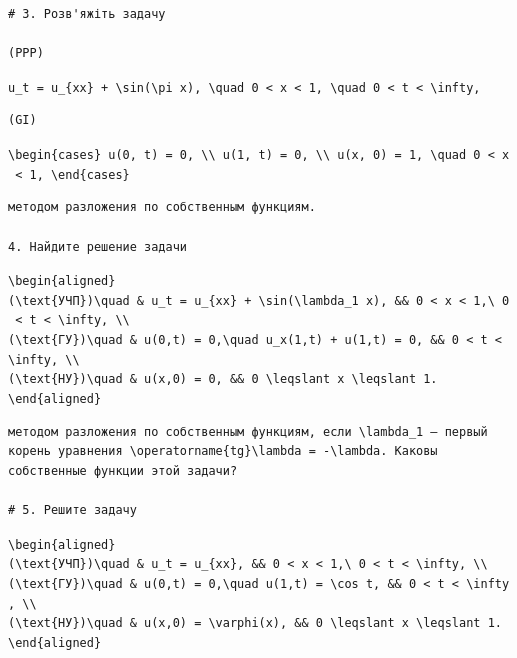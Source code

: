 \documentclass[
  ukrainian,
]{article}
\begin{document}
\begin{verbatim}
# 3. Розв'яжіть задачу

(PPP)
\end{verbatim}

\texttt{u\_t\ =\ u\_\{xx\}\ +\ \textbackslash{}sin(\textbackslash{}pi\ x),\ \textbackslash{}quad\ 0\ \textless{}\ x\ \textless{}\ 1,\ \textbackslash{}quad\ 0\ \textless{}\ t\ \textless{}\ \textbackslash{}infty,}

\begin{verbatim}
(GI)
\end{verbatim}

\texttt{\textbackslash{}begin\{cases\}\ u(0,\ t)\ =\ 0,\ \textbackslash{}\textbackslash{}\ u(1,\ t)\ =\ 0,\ \textbackslash{}\textbackslash{}\ u(x,\ 0)\ =\ 1,\ \textbackslash{}quad\ 0\ \textless{}\ x\ \textless{}\ 1,\ \textbackslash{}end\{cases\}}

\begin{verbatim}
методом разложения по собственным функциям.

4. Найдите решение задачи
\end{verbatim}

\texttt{\textbackslash{}begin\{aligned\}}
\texttt{(\textbackslash{}text\{УЧП\})\textbackslash{}quad\ \&\ u\_t\ =\ u\_\{xx\}\ +\ \textbackslash{}sin(\textbackslash{}lambda\_1\ x),\ \&\&\ 0\ \textless{}\ x\ \textless{}\ 1,\textbackslash{}\ 0\ \textless{}\ t\ \textless{}\ \textbackslash{}infty,\ \textbackslash{}\textbackslash{}}
\texttt{(\textbackslash{}text\{ГУ\})\textbackslash{}quad\ \&\ u(0,t)\ =\ 0,\textbackslash{}quad\ u\_x(1,t)\ +\ u(1,t)\ =\ 0,\ \&\&\ 0\ \textless{}\ t\ \textless{}\ \textbackslash{}infty,\ \textbackslash{}\textbackslash{}}
\texttt{(\textbackslash{}text\{НУ\})\textbackslash{}quad\ \&\ u(x,0)\ =\ 0,\ \&\&\ 0\ \textbackslash{}leqslant\ x\ \textbackslash{}leqslant\ 1.}
\texttt{\textbackslash{}end\{aligned\}}

\begin{verbatim}
методом разложения по собственным функциям, если \lambda_1 — первый корень уравнения \operatorname{tg}\lambda = -\lambda. Каковы собственные функции этой задачи?

# 5. Решите задачу
\end{verbatim}

\texttt{\textbackslash{}begin\{aligned\}}
\texttt{(\textbackslash{}text\{УЧП\})\textbackslash{}quad\ \&\ u\_t\ =\ u\_\{xx\},\ \&\&\ 0\ \textless{}\ x\ \textless{}\ 1,\textbackslash{}\ 0\ \textless{}\ t\ \textless{}\ \textbackslash{}infty,\ \textbackslash{}\textbackslash{}}
\texttt{(\textbackslash{}text\{ГУ\})\textbackslash{}quad\ \&\ u(0,t)\ =\ 0,\textbackslash{}quad\ u(1,t)\ =\ \textbackslash{}cos\ t,\ \&\&\ 0\ \textless{}\ t\ \textless{}\ \textbackslash{}infty,\ \textbackslash{}\textbackslash{}}
\texttt{(\textbackslash{}text\{НУ\})\textbackslash{}quad\ \&\ u(x,0)\ =\ \textbackslash{}varphi(x),\ \&\&\ 0\ \textbackslash{}leqslant\ x\ \textbackslash{}leqslant\ 1.}
\texttt{\textbackslash{}end\{aligned\}}
\end{document}
